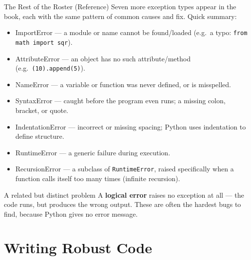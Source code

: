 \documentclass[9pt,aspectratio=169,xcolor=table]{beamer}
\begin{document}
\begin{frame}{The Rest of the Roster (Reference)}
    \leavevmode
    \small
    Seven more exception types appear in the book, each with the same
    pattern of common causes and fix. Quick summary:

    \vspace{2mm}
    \begin{itemize}\scriptsize
        \item \alert{ImportError} --- a module or name cannot be found/loaded
              (e.g.\ a typo: \texttt{from math import sqr}).
        \item \alert{AttributeError} --- an object has no such
              attribute/method (e.g.\ \texttt{(10).append(5)}).
        \item \alert{NameError} --- a variable or function was never
              defined, or is misspelled.
        \item \alert{SyntaxError} --- caught before the program even
              runs; a missing colon, bracket, or quote.
        \item \alert{IndentationError} --- incorrect or missing
              spacing; Python uses indentation to define structure.
        \item \alert{RuntimeError} --- a generic failure during
              execution.
        \item \alert{RecursionError} --- a subclass of
              \texttt{RuntimeError}, raised specifically when a function
              calls itself too many times (infinite recursion).
    \end{itemize}

    \vspace{2mm}
    \begin{alertblock}{A related but distinct problem}
        A \textbf{logical error} raises no exception at all --- the
        code runs, but produces the \alert{wrong} output. These are
        often the hardest bugs to find, because Python gives no error
        message.
    \end{alertblock}
\end{frame}

\section{Writing Robust Code}
\end{document}
